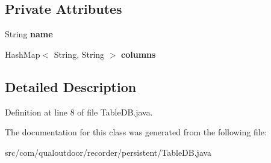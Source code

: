 \subsection*{Private Attributes}
\begin{DoxyCompactItemize}
\item 
\hypertarget{classcom_1_1qualoutdoor_1_1recorder_1_1persistent_1_1TableDB_af2105154a40f7c2500778dd7bbd67f2e}{String {\bfseries name}}\label{classcom_1_1qualoutdoor_1_1recorder_1_1persistent_1_1TableDB_af2105154a40f7c2500778dd7bbd67f2e}

\item 
\hypertarget{classcom_1_1qualoutdoor_1_1recorder_1_1persistent_1_1TableDB_a18c4b8a587a70f6abf03377af7ec4abb}{Hash\-Map$<$ String, String $>$ {\bfseries columns}}\label{classcom_1_1qualoutdoor_1_1recorder_1_1persistent_1_1TableDB_a18c4b8a587a70f6abf03377af7ec4abb}

\end{DoxyCompactItemize}


\subsection{Detailed Description}


Definition at line 8 of file Table\-D\-B.\-java.



The documentation for this class was generated from the following file\-:\begin{DoxyCompactItemize}
\item 
src/com/qualoutdoor/recorder/persistent/Table\-D\-B.\-java\end{DoxyCompactItemize}
